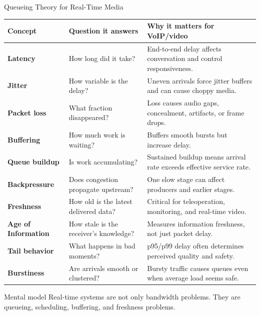 \documentclass[aspectratio=169]{beamer}
\begin{document}
\begin{frame}{Queueing Theory for Real-Time Media}
\tiny

\begin{tabular}{p{2.4cm} p{3.0cm} p{6.5cm}}
\toprule
\textbf{Concept} & \textbf{Question it answers} & \textbf{Why it matters for VoIP/video} \\
\midrule
\textbf{Latency} & How long did it take? & End-to-end delay affects conversation and control responsiveness. \\
\textbf{Jitter} & How variable is the delay? & Uneven arrivals force jitter buffers and can cause choppy media. \\
\textbf{Packet loss} & What fraction disappeared? & Loss causes audio gaps, concealment, artifacts, or frame drops. \\
\textbf{Buffering} & How much work is waiting? & Buffers smooth bursts but increase delay. \\
\textbf{Queue buildup} & Is work accumulating? & Sustained buildup means arrival rate exceeds effective service rate. \\
\textbf{Backpressure} & Does congestion propagate upstream? & One slow stage can affect producers and earlier stages. \\
\textbf{Freshness} & How old is the latest delivered data? & Critical for teleoperation, monitoring, and real-time video. \\
\textbf{Age of Information} & How stale is the receiver's knowledge? & Measures information freshness, not just packet delay. \\
\textbf{Tail behavior} & What happens in bad moments? & p95/p99 delay often determines perceived quality and safety. \\
\textbf{Burstiness} & Are arrivals smooth or clustered? & Bursty traffic causes queues even when average load seems safe. \\
\bottomrule
\end{tabular}

\vspace{0.15cm}

\begin{block}{Mental model}
Real-time systems are not only bandwidth problems. They are queueing, scheduling, buffering, and freshness problems.
\end{block}

\end{frame}
\end{document}
